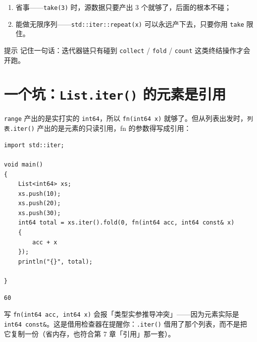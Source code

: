 \begin{enumerate}

\item 省事——\texttt{take(\allowbreak{}3)\allowbreak{}} 时，源数据只要产出 3 个就够了，后面的根本不碰；

\item 能做无限序列——\texttt{std:\allowbreak{}:\allowbreak{}iter:\allowbreak{}:\allowbreak{}repeat(\allowbreak{}x)\allowbreak{}} 可以永远产下去，只要你用 \texttt{take} 限住。

\end{enumerate}

\begin{tip}{提示}
记住一句话：迭代器链只有碰到 \texttt{collect} / \texttt{fold} / \texttt{count} 这类终结操作才会开跑。
\end{tip}

\section{一个坑：\texttt{List.\allowbreak{}iter(\allowbreak{})\allowbreak{}} 的元素是引用}

\texttt{range} 产出的是实打实的 \texttt{int64}，所以 \texttt{fn(\allowbreak{}int64 x)\allowbreak{}} 就够了。但从列表出发时，\texttt{列表.\allowbreak{}iter(\allowbreak{})\allowbreak{}} 产出的是元素的只读引用，fn 的参数得写成引用：

\par
\medskip
\begin{lstlisting}[style=chali]
import std::iter;

void main()
{
    List<int64> xs;
    xs.push(10);
    xs.push(20);
    xs.push(30);
    int64 total = xs.iter().fold(0, fn(int64 acc, int64 const& x)
    {
        acc + x
    });
    println("{}", total);

}
\end{lstlisting}
\par
\medskip

\par
\medskip
\begin{lstlisting}[style=out]
60
\end{lstlisting}
\par
\medskip

写 \texttt{fn(\allowbreak{}int64 acc,\allowbreak{} int64 x)\allowbreak{}} 会报「类型实参推导冲突」——因为元素实际是\texttt{int64 const\&}。这是借用检查器在提醒你：\texttt{.\allowbreak{}iter(\allowbreak{})\allowbreak{}} 借用了那个列表，而不是把它复制一份（省内存，也符合第 7 章「引用」那一套）。

